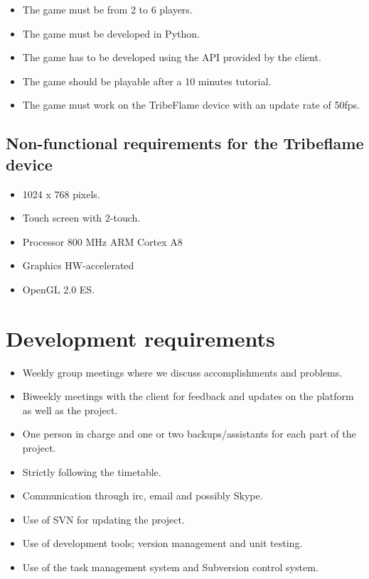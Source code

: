 \documentclass[12pt,a4paper]{article}
\begin{document}
\begin{itemize}
\item The game must be from 2 to 6 players.
\item The game must be developed in Python.
\item The game has to be developed using the API provided by the client.
\item The game should be playable after a 10 minutes tutorial.
\item The game must work on the TribeFlame device with an update rate
  of 50fps.
\end{itemize}

\subsection{Non-functional requirements for the Tribeflame device}

\begin{itemize}
\item 1024 x 768 pixels.
\item Touch screen with 2-touch. 
\item Processor 800 MHz ARM Cortex A8
\item Graphics HW-accelerated
\item OpenGL 2.0 ES.
\end{itemize}

\section{Development requirements}

\begin{itemize}
\item Weekly group meetings where we discuss accomplishments and problems.
\item Biweekly meetings with the client for feedback and updates on
  the platform as well as the project.
\item One person in charge and one or two backups/assistants for each
  part of the project.
\item Strictly following the timetable.
\item Communication through irc, email and possibly Skype.
\item Use of SVN for updating the project.
\item Use of development tools; version management and unit testing.
\item Use of the task management system and Subversion control system.
\end{itemize}
\end{document}
